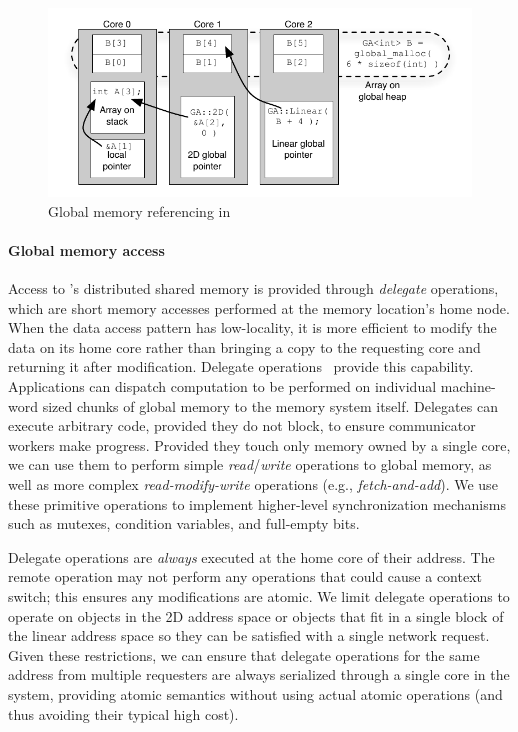 \begin{figure}[t]
\begin{center}
  \includegraphics[width=0.95\columnwidth]{figs/memory-structure}
\begin{minipage}{0.95\columnwidth}
  \caption{\label{fig:memory-structure} Global memory referencing in \Grappa}
\end{minipage}
\vspace{-3ex}
\end{center}
\end{figure}

\paragraph{Global memory access} 
Access to \Grappa's distributed shared memory is provided through  {\em
delegate\/} operations, which are short memory accesses performed at the memory
location's home node. When the data access pattern has
low-locality, it is more efficient to modify the data on its home core rather
than bringing a copy to the requesting core and returning it after
modification. Delegate operations~\cite{Nelson:hotpar11, delegated:oopsla11}
provide this capability. Applications can dispatch computation to be performed
on individual machine-word sized chunks of global memory to the memory system
itself.
Delegates can execute arbitrary code, provided they do not block, to ensure communicator workers make progress. Provided they touch only memory owned by a single core, we can use them to perform simple
\emph{read\/}/\emph{write\/} operations to global memory, as well as more complex \emph{read-modify-write\/} operations (e.g., \emph{fetch-and-add\/}). We use these primitive operations to implement higher-level synchronization mechanisms such as mutexes, condition variables, and full-empty bits.

Delegate operations are \emph{always\/} executed at the home core of their
address. The remote operation may not perform any operations that could cause
a context switch; this ensures any modifications are atomic. We limit delegate
operations to operate on objects in the 2D address space or objects that fit
in a single block of the linear address space so they can be satisfied with a
single network request. Given these restrictions, we can ensure that delegate
operations for the same address from multiple requesters are always serialized
through a single core in the system, providing atomic semantics without using
actual atomic operations (and thus avoiding their typical high cost).

